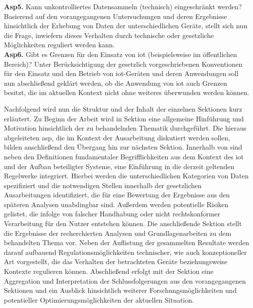 \textbf{Asp5.} Kann unkontrolliertes Datensammeln (technisch) eingeschränkt werden? Basierend auf den vorangegangenen Untersuchungen und deren Ergebnisse hinsichtlich der Erhebung von Daten der unterschiedlichen Geräte, stellt sich nun die Frage, inwiefern dieses Verhalten durch technische oder gesetzliche Möglichkeiten reguliert werden kann.\\
\textbf{Asp6.} Gibt es Grenzen für den Einsatz von \ac{iot} (beispielsweise im öffentlichen Bereich)? Unter Berücksichtigung der gesetzlich vorgeschriebenen Konventionen für den Einsatz und den Betrieb von \ac{iot}-Geräten und deren Anwendungen soll nun abschließend geklärt werden, ob die Anwendung von \ac{iot} auch Grenzen besitzt, die im aktuellen Kontext nicht ohne weiteres überwunden werden können.


Nachfolgend wird nun die Struktur und der Inhalt der einzelnen Sektionen kurz erläutert. 
Zu Beginn der Arbeit wird in Sektion  eine allgemeine Hinführung und Motivation hinsichtlich der zu behandelnden Thematik durchgeführt. Die hieraus abgeleiteten \ac{asp}, die im Kontext der Ausarbeitung diskutiert werden sollen, bilden anschließend den Übergang hin zur nächsten Sektion. 
Innerhalb von  sind neben den Definitionen fundamentaler Begrifflichkeiten aus dem Kontext des \ac{iot} und der Aufbau beteiligter Systeme, eine Einführung in die derzeit geltenden Regelwerke integriert. 
Hierbei werden die unterschiedlichen Kategorien von Daten spezifiziert und die notwendigen Stellen innerhalb der gesetzlichen Ausarbeitungen identifiziert, die für eine Bewertung der Ergebnisse aus den späteren Analysen unabdingbar sind. 
Außerdem werden potentielle Risiken gelistet, die infolge von falscher Handhabung oder nicht rechtskonformer Verarbeitung für den Nutzer entstehen können. Die anschließende Sektion  stellt die Ergebnisse der recherchierten Analysen und Grundlagenarbeiten zu dem behandelten Thema vor. 
Neben der Auflistung der gesammelten Resultate werden darauf aufbauend Regulationsmöglichkeiten technischer, wie auch konzeptioneller Art vorgestellt, die das Verhalten der betrachteten Geräte beziehungsweise Kontexte regulieren können. 
Abschließend erfolgt mit der Sektion  eine Aggregation und Interpretation der Schlussfolgerungen aus den vorangegangenen Sektionen und ein Ausblick hinsichtlich weiterer Forschungsmöglichkeiten und potentieller Optimierungsmöglichkeiten der aktuellen Situation. 

